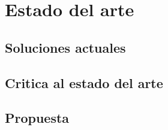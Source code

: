 \chapter{Estado del arte}
\label{ch:estado}
\section{Soluciones actuales}

\section{Critica al estado del arte}

\section{Propuesta}